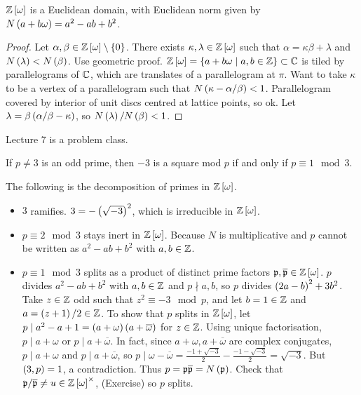 \begin{theorem}
$ \mathbb{Z}\left[ \omega \right] $ is a Euclidean domain, with Euclidean norm given by $ N\left( a + b\omega \right) = a^2 - ab + b^2 $.
\end{theorem}

\begin{proof}
Let $ \alpha, \beta \in \mathbb{Z}\left[ \omega \right] \setminus \left\{ 0 \right\} $. There exists $ \kappa, \lambda \in \mathbb{Z}\left[ \omega \right] $ such that $ \alpha = \kappa\beta + \lambda $ and $ N\left( \lambda \right) < N\left( \beta \right) $. Use geometric proof. $ \mathbb{Z}\left[ \omega \right] = \left\{ a + b\omega \mid a, b \in \mathbb{Z} \right\} \subset \mathbb{C} $ is tiled by parallelograms of $ \mathbb{C} $, which are translates of a parallelogram at $ \pi $. Want to take $ \kappa $ to be a vertex of a parallelogram such that $ N\left( \kappa - \alpha / \beta \right) < 1 $. Parallelogram covered by interior of unit discs centred at lattice points, so ok. Let $ \lambda = \beta\left( \alpha / \beta - \kappa \right) $, so $ N\left( \lambda \right) / N\left( \beta \right) < 1 $.
\end{proof}


Lecture 7 is a problem class.


\begin{lemma}
If $ p \ne 3 $ is an odd prime, then $ -3 $ is a square mod $ p $ if and only if $ p \equiv 1 \mod 3 $.
\end{lemma}

The following is the decomposition of primes in $ \mathbb{Z}\left[ \omega \right] $.
\begin{itemize}
\item $ 3 $ ramifies. $ 3 = -\left( \sqrt{-3} \right)^2 $, which is irreducible in $ \mathbb{Z}\left[ \omega \right] $.
\item $ p \equiv 2 \mod 3 $ stays inert in $ \mathbb{Z}\left[ \omega \right] $. Because $ N $ is multiplicative and $ p $ cannot be written as $ a^2 - ab + b^2 $ with $ a, b \in \mathbb{Z} $.
\item $ p \equiv 1 \mod 3 $ splits as a product of distinct prime factors $ \mathfrak{p}, \overline{\mathfrak{p}} \in \mathbb{Z}\left[ \omega \right] $. $ p $ divides $ a^2 - ab + b^2 $ with $ a, b \in \mathbb{Z} $ and $ p \nmid a, b $, so $ p $ divides $ \left( 2a - b \right)^2 + 3b^2 $. Take $ z \in \mathbb{Z} $ odd such that $ z^2 \equiv -3 \mod p $, and let $ b = 1 \in \mathbb{Z} $ and $ a = \left( z + 1 \right) / 2 \in \mathbb{Z} $. To show that $ p $ splits in $ \mathbb{Z}\left[ \omega \right] $, let $ p \mid a^2 - a + 1 = \left( a + \omega \right)\left( a + \overline{\omega} \right) $ for $ z \in \mathbb{Z} $. Using unique factorisation, $ p \mid a + \omega $ or $ p \mid a + \overline{\omega} $. In fact, since $ a + \omega, a + \overline{\omega} $ are complex conjugates, $ p \mid a + \omega $ and $ p \mid a + \overline{\omega} $, so $ p \mid \omega - \overline{\omega} = \tfrac{-1 + \sqrt{-3}}{2} - \tfrac{-1 - \sqrt{-3}}{2} = \sqrt{-3} $. But $ \left( 3, p \right) = 1 $, a contradiction. Thus $ p = \mathfrak{p}\overline{\mathfrak{p}} = N\left( \mathfrak{p} \right) $. Check that $ \mathfrak{p} / \overline{\mathfrak{p}} \ne u \in \mathbb{Z}\left[ \omega \right]^\times $, (Exercise) so $ p $ splits.
\end{itemize}

